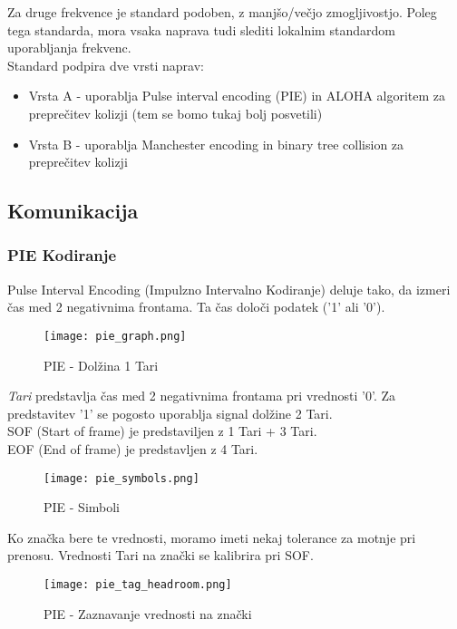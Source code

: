 \documentclass[]{article}
\begin{document}
Za druge frekvence je standard podoben, z manj\v{s}o/ve\v{c}jo
zmogljivostjo. Poleg tega standarda, mora vsaka naprava
tudi slediti lokalnim standardom uporabljanja frekvenc. \\

\noindent
Standard podpira dve vrsti naprav:
\begin{itemize}
    \item Vrsta A - uporablja Pulse interval encoding (PIE) in
      ALOHA algoritem za prepre\v{c}itev kolizji (tem se bomo
      tukaj bolj posvetili)
    \item Vrsta B - uporablja Manchester encoding in binary tree
      collision za prepre\v{c}itev kolizji
\end{itemize}

\clearpage
\subsection{Komunikacija}
\subsubsection{PIE Kodiranje}
Pulse Interval Encoding (Impulzno Intervalno Kodiranje) deluje tako,
da izmeri \v{c}as med 2 negativnima frontama. Ta \v{c}as dolo\v{c}i
podatek ('1' ali '0').

\begin{figure}[H] %
  \centering
  \texttt{[image: pie\_graph.png]}
  \caption{PIE - Dol\v{z}ina 1 Tari}
\end{figure}

\noindent
\emph{Tari} predstavlja \v{c}as med 2 negativnima frontama pri
vrednosti '0'. Za predstavitev '1' se pogosto uporablja signal
dol\v{z}ine 2 Tari. \\
SOF (Start of frame) je predstaviljen z 1 Tari + 3 Tari. \\
EOF (End of frame) je predstavljen z 4 Tari. \\

\begin{figure}[H] %
  \centering
  \texttt{[image: pie\_symbols.png]}
  \caption{PIE - Simboli}
\end{figure}
 
Ko zna\v{c}ka bere te vrednosti, moramo imeti nekaj tolerance za
motnje pri prenosu. Vrednosti Tari na zna\v{c}ki se kalibrira pri
SOF.

\begin{figure}[H] %
  \centering
  \texttt{[image: pie\_tag\_headroom.png]}
  \caption{PIE - Zaznavanje vrednosti na zna\v{c}ki}
\end{figure}
\end{document}
